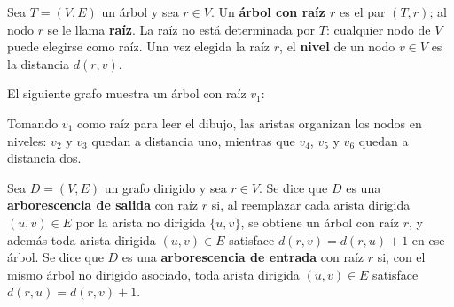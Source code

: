             \begin{definicion}
                Sea $T=(V,E)$ un árbol y sea $r\in V$. Un \textbf{árbol con raíz $r$} es el par $(T,r)$; al nodo $r$ se le llama \textbf{raíz}. La raíz no está determinada por $T$: cualquier nodo de $V$ puede elegirse como raíz. Una vez elegida la raíz $r$, el \textbf{nivel} de un nodo $v\in V$ es la distancia $d(r,v)$.
            \end{definicion}

            \begin{ejemplo}[Árbol]
                El siguiente grafo muestra un árbol con raíz $v_1$:

                \begin{center}
                \end{center}

                Tomando $v_1$ como raíz para leer el dibujo, las aristas organizan los nodos en niveles: $v_2$ y $v_3$ quedan a distancia uno, mientras que $v_4$, $v_5$ y $v_6$ quedan a distancia dos.
            \end{ejemplo}

            \begin{definicion}[Arborescencia]
                Sea $D=(V,E)$ un grafo dirigido y sea $r\in V$. Se dice que $D$ es una \textbf{arborescencia de salida} con raíz $r$ si, al reemplazar cada arista dirigida $(u,v)\in E$ por la arista no dirigida $\{u,v\}$, se obtiene un árbol con raíz $r$, y además toda arista dirigida $(u,v)\in E$ satisface $d(r,v)=d(r,u)+1$ en ese árbol. Se dice que $D$ es una \textbf{arborescencia de entrada} con raíz $r$ si, con el mismo árbol no dirigido asociado, toda arista dirigida $(u,v)\in E$ satisface $d(r,u)=d(r,v)+1$.
            \end{definicion}

